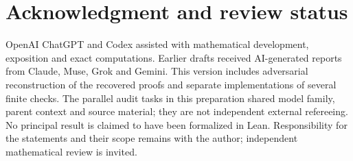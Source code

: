 \documentclass[11pt]{article}
\numberwithin{equation}{section}
\theoremstyle{definition}
\theoremstyle{remark}
\begin{document}
\section*{Acknowledgment and review status}
OpenAI ChatGPT and Codex assisted with mathematical development, exposition and exact computations. Earlier drafts received AI-generated reports from Claude, Muse, Grok and Gemini. This version includes adversarial reconstruction of the recovered proofs and separate implementations of several finite checks. The parallel audit tasks in this preparation shared model family, parent context and source material; they are not independent external refereeing. No principal result is claimed to have been formalized in Lean. Responsibility for the statements and their scope remains with the author; independent mathematical review is invited.
\clearpage
{}
\begingroup\raggedright\small


\endgroup
\end{document}
